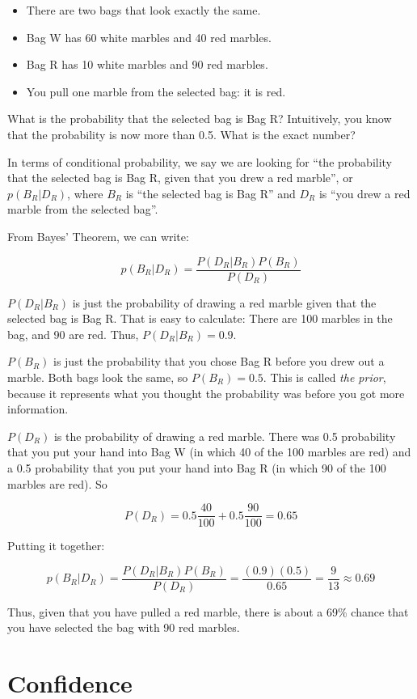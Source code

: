 \begin{itemize}
\item There are two bags that look exactly the same.
\item Bag W has 60 white marbles and 40 red marbles.
\item Bag R has 10 white marbles and 90 red marbles.
\item You pull one marble from the selected bag: it is red.
\end{itemize}

What is the probability that the selected bag is Bag R? Intuitively,
you know that the probability is now more than 0.5. What is the exact
number?

In terms of conditional probability, we say we are looking for ``the probability
that the selected bag is Bag R, given that you drew a red marble'', or
$p(B_R | D_R)$, where $B_R$ is ``the selected bag is Bag R'' and $D_R$ is
``you drew a red marble from the selected bag''.

From Bayes' Theorem, we can write:

$$p(B_R | D_R) = \frac{ P(D_R | B_R) P(B_R) } {P(D_R)}$$

$P(D_R | B_R)$ is just the probability of drawing a red marble given that the
selected bag is Bag R. That is easy to calculate: There are 100
marbles in the bag, and 90 are red. Thus, $P(D_R | B_R) = 0.9$.

$P(B_R)$ is just the probability that you chose Bag R before you drew
out a marble. Both bags look the same, so $P(B_R)= 0.5$. This is
called \textit{the prior}, because it represents what you thought the
probability was before you got more information.

$P(D_R)$ is the probability of drawing a red marble. There was 0.5
probability that you put your hand into Bag W (in which 40 of the 100
marbles are red) and a 0.5 probability that you put your hand into Bag
R (in which 90 of the 100 marbles are red).  So

$$P(D_R) = 0.5 \frac{40}{100} + 0.5 \frac{90}{100} = 0.65$$

Putting it together:

$$p(B_R | D_R) = \frac{ P(D_R | B_R) P(B_R) } {P(D_R)} = \frac{(0.9)(0.5)}{0.65} = \frac{9}{13} \approx 0.69$$

Thus, given that you have pulled a red marble, there is about a 69\% chance
that you have selected the bag with 90 red marbles.

\section{Confidence}

